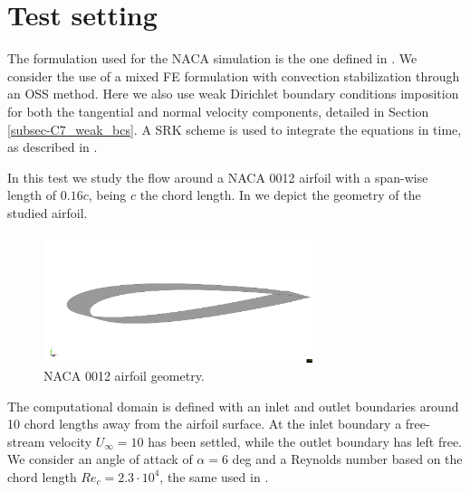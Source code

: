 
\section{Test setting}
\label{sec-C8_setting}
The formulation used for the NACA simulation is the one defined in . We consider the use of a mixed FE formulation with convection stabilization through an OSS method. Here we also use weak Dirichlet boundary conditions imposition for both the tangential and normal velocity components, detailed in Section \ref{subsec-C7_weak_bcs}. A SRK scheme is used to integrate the equations in time, as described in .

In this test we study the flow around a NACA 0012 airfoil with a span-wise length of $ 0.16c $, being $ c $ the chord length. In  we depict the geometry of the studied airfoil.
\begin{figure}[h!]
  \centering
  \includegraphics[width=0.7\textwidth,clip=true,trim=5cm 8cm 1cm 8cm]{Figures/Chapter8/geometry_3d}
  \caption{NACA 0012 airfoil geometry.}
  \label{fig-NACA_geometry}
\end{figure}
The computational domain is defined with an inlet and outlet boundaries around 10 chord lengths away from the airfoil surface. At the inlet boundary a free-stream velocity $U_\infty=10$ has been settled, while the outlet boundary has left free. We consider an angle of attack of $ \alpha = 6 $ deg and a Reynolds number based on the chord length $ Re_c=2.3\cdot10^4 $, the same used in \cite{kojima_large-eddy_2013,_boundary_????}.

